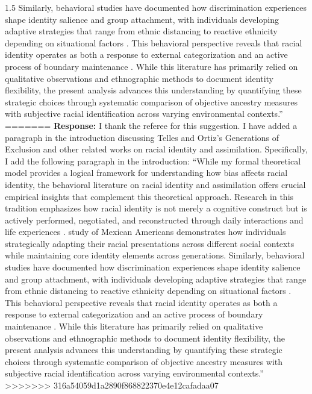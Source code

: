 \documentclass[12pt,english]{article}
\newcommand{\rrxspc}{1.5}
\begin{document}
\begin{refsection}
\begin{spacing}{\rrxspc}
        Similarly, behavioral studies have documented how discrimination experiences shape identity salience and group attachment, with individuals developing adaptive strategies that range from ethnic distancing to reactive ethnicity depending on situational factors \autocite{zhou1997segmented}. This behavioral perspective reveals that racial identity operates as both a response to external categorization and an active process of boundary maintenance \autocite{cornell2006ethnicity}. While this literature has primarily relied on qualitative observations and ethnographic methods to document identity flexibility, the present analysis advances this understanding by quantifying these strategic choices through systematic comparison of objective ancestry measures with subjective racial identification across varying environmental contexts.''
=======
        \textbf{Response:} I thank the referee for this suggestion. I have added a paragraph in the introduction discussing Telles and Ortiz's Generations of Exclusion and other related works on racial identity and assimilation. Specifically, I add the following paragraph in the introduction: ``While my formal theoretical model provides a logical framework for understanding how bias affects racial identity, the behavioral literature on racial identity and assimilation offers crucial empirical insights that complement this theoretical approach. Research in this tradition emphasizes how racial identity is not merely a cognitive construct but is actively performed, negotiated, and reconstructed through daily interactions and life experiences \autocite{waters1990ethnic}. \textcite{telles2008generations} study of Mexican Americans demonstrates how individuals strategically adapting their racial presentations across different social contexts while maintaining core identity elements across generations. Similarly, behavioral studies have documented how discrimination experiences shape identity salience and group attachment, with individuals developing adaptive strategies that range from ethnic distancing to reactive ethnicity depending on situational factors \autocite{zhou1997segmented}. This behavioral perspective reveals that racial identity operates as both a response to external categorization and an active process of boundary maintenance \autocite{cornell2006ethnicity}. While this literature has primarily relied on qualitative observations and ethnographic methods to document identity flexibility, the present analysis advances this understanding by quantifying these strategic choices through systematic comparison of objective ancestry measures with subjective racial identification across varying environmental contexts.''
>>>>>>> 316a54059d1a2890f868822370e4e12cafadaa07
    \end{spacing}
    

\end{refsection}
\end{document}
